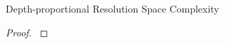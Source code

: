 \begin{theorem}{Depth-proportional Resolution Space Complexity}
\label{thm:depth-proportional-resolution-algo-space-complexity}

\end{theorem}

\begin{proof}
\label{prf:depth-proportional-resolution-algo-space-complexity}

\end{proof}
